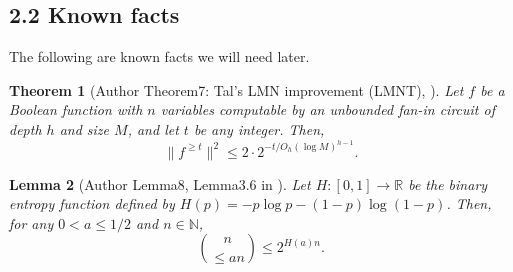 \documentclass[10pt,a4paper]{article}
\newtheorem{nttheorem}{Theorem}
\newtheorem{ntlemma}[nttheorem]{Lemma}
\begin{document}
\subsection*{2.2 Known facts}
The following are known facts we will need later.
\begin{nttheorem}[Author Theorem7: Tal's LMN improvement (LMNT), {\cite{ref24,ref30}}]
Let $f$ be a Boolean function with $n$ variables computable by an unbounded fan-in circuit of depth $h$ and size $M$, and let $t$ be any integer. Then,
\[\|f^{\geq t}\|^2\leq2\cdot2^{-t/O_h(\log M)^{h-1}}.\]
\end{nttheorem}
\begin{ntlemma}[Author Lemma8, Lemma3.6 in {\cite{ref21}}]
Let $H:[0,1]\to\mathbb R$ be the binary entropy function defined by $H(p)=-p\log p-(1-p)\log(1-p)$. Then, for any $0<a\leq1/2$ and $n\in\mathbb N$,
\[\binom n{\leq an}\leq2^{H(a)n}.\]
\end{ntlemma}
\end{document}
